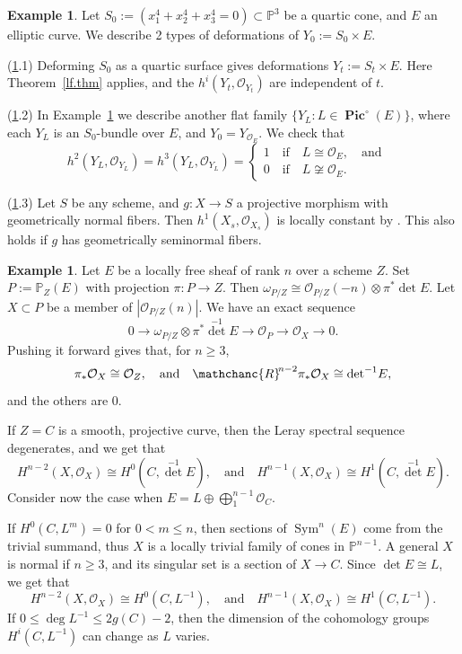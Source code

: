 \documentclass{amsart}
\theoremstyle{definition}
\newtheorem{exmp}[thm]{Example}
\theoremstyle{remark}
\renewcommand{\o}[0]{{\mathcal O}}
\newcommand{\p}[0]{{\mathbb P}}
\newcommand{\qtq}[1]{\quad\mbox{#1}\quad}
\newcommand{\pico}[0]{\operatorname{\mathbf{Pic}}^{\circ}}
\newcommand{\sym}[0]{\operatorname{Sym}}
\newcommand{\myR}{{\mathchanc{R}\!}}
\begin{document}
 \begin{exmp}\label{exmp.1}   Let  $S_0:=(x_1^4+x_2^4+x_3^4=0)\subset \p^3$ be a quartic cone, and $E$ an elliptic curve.
   We describe 2 types of deformations of $Y_0:=S_0\times E$.

   (\ref{exmp.1}.1)  Deforming $S_0$ as a quartic surface gives deformations $Y_t:=S_t\times E$.  Here Theorem~\ref{lf.thm} applies, and the
   $h^i(Y_t, \o_{Y_t})$ are independent of $t$.

   (\ref{exmp.1}.2) In Example~\ref{exmp.2} we describe another flat family  $\{Y_L: L\in \pico(E)\}$, where each $Y_L$ is an $S_0$-bundle over $E$, and $Y_0=Y_{\o_E}$. We check that
   $$
   h^2(Y_L, \o_{Y_L})= h^3(Y_L, \o_{Y_L})=
   \left\{
   \begin{array} {l}
     1 \qtq{if} L\cong \o_E, \qtq{and}\\
     0 \qtq{if} L\not\cong \o_E.
   \end{array}
   \right.
   $$

   (\ref{exmp.1}.3)  Let $S$ be any scheme, and $g:X\to S$ a  projective morphism with geometrically normal fibers. Then 
   $h^1(X_s, \o_{X_s})$ is locally constant by \cite[VI.2.7]{FGA}.
   This also holds if $g$ has  geometrically seminormal fibers.
 \end{exmp}
 

 \begin{exmp}\label{exmp.2}   Let $E$ be a locally free sheaf of rank $n$ over a scheme $Z$.
   Set $P:=\p_Z(E)$ with projection $\pi:P\to Z$.
   Then $\omega_{P/Z}\cong \o_{P/Z}(-n)\otimes \pi^*\det E$.
   Let $X\subset P$ be a member of $|\o_{P/Z}(n)|$. We have an exact sequence
   $$
   0\to \omega_{P/Z}\otimes \pi^*{\det}^{-1} E\to \o_P\to \o_X\to 0.
   $$
   Pushing it forward  gives that, for $n\geq 3$, 
   $$
   \pi_*\o_X\cong \o_Z,\qtq{and}
   \myR^{n-2}\pi_*\o_X\cong {\det}^{-1} E,
   $$
   and the others are 0.

   If $Z=C$ is a smooth, projective curve, then the Leray spectral sequence degenerates, and we get that
   $$
   H^{n-2}(X, \o_X)\cong H^0(C, {\det}^{-1} E),\qtq{and}
   H^{n-1}(X, \o_X)\cong H^1(C, {\det}^{-1} E).
   $$
   Consider now the case when
   $E=L\oplus\bigoplus_1^{n-1}\o_C$.
   

   If $H^0(C, L^m)=0$ for $0<m\leq n$, then sections of $\sym^n(E)$ come from the trivial summand,
   thus $X$ is a locally trivial family of cones in $\p^{n-1}$.
   A general $X$ is normal if $n\geq 3$, and its singular set is a section of
   $X\to C$.
Since  $\det E\cong L$, we get that
   $$
   H^{n-2}(X, \o_X)\cong H^0(C, L^{-1}),\qtq{and}
   H^{n-1}(X, \o_X)\cong H^1(C, L^{-1}).
   $$
   If $0\leq \deg L^{-1}\leq 2g(C)-2$, then the dimension of the cohomology groups $H^i(C, L^{-1})$ can change as $L$ varies.
   \end{exmp}
\end{document}
